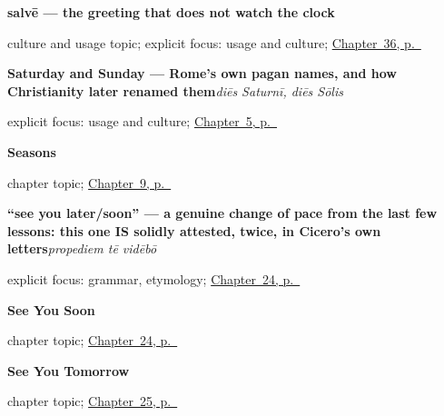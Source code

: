 \noindent\begin{minipage}[t]{\linewidth}
\raggedright
\textbf{salvē — the greeting that does not watch the clock}\par
\footnotesize culture and usage topic; explicit focus: usage and culture; \hyperref[ch:la-good-afternoon]{Chapter~36, p.~\pageref*{ch:la-good-afternoon}}
\end{minipage}\par\smallskip

\noindent\begin{minipage}[t]{\linewidth}
\raggedright
\textbf{Saturday and Sunday — Rome's own pagan names, and how Christianity later renamed them}\enspace\emph{diēs Saturnī, diēs Sōlis}\par
\footnotesize explicit focus: usage and culture; \hyperref[ch:la-days-of-the-week]{Chapter~5, p.~\pageref*{ch:la-days-of-the-week}}
\end{minipage}\par\smallskip

\noindent\begin{minipage}[t]{\linewidth}
\raggedright
\textbf{Seasons}\par
\footnotesize chapter topic; \hyperref[ch:la-seasons]{Chapter~9, p.~\pageref*{ch:la-seasons}}
\end{minipage}\par\smallskip

\noindent\begin{minipage}[t]{\linewidth}
\raggedright
\textbf{\textquotedblleft{}see you later/soon\textquotedblright{} — a genuine change of pace from the last few lessons: this one IS solidly attested, twice, in Cicero's own letters}\enspace\emph{propediem tē vidēbō}\par
\footnotesize explicit focus: grammar, etymology; \hyperref[ch:la-see-you-soon]{Chapter~24, p.~\pageref*{ch:la-see-you-soon}}
\end{minipage}\par\smallskip

\noindent\begin{minipage}[t]{\linewidth}
\raggedright
\textbf{See You Soon}\par
\footnotesize chapter topic; \hyperref[ch:la-see-you-soon]{Chapter~24, p.~\pageref*{ch:la-see-you-soon}}
\end{minipage}\par\smallskip

\noindent\begin{minipage}[t]{\linewidth}
\raggedright
\textbf{See You Tomorrow}\par
\footnotesize chapter topic; \hyperref[ch:la-see-you-tomorrow]{Chapter~25, p.~\pageref*{ch:la-see-you-tomorrow}}
\end{minipage}\par\smallskip

